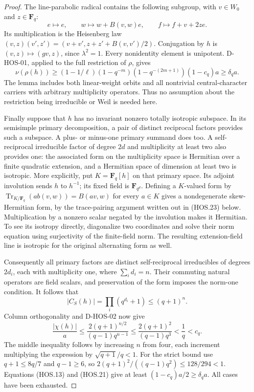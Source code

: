 \begin{proof}
The line-parabolic radical contains the following subgroup, with
$v\in W_0$ and $z\in\mathbf F_q$:
\[
 e\mapsto e,\qquad w\mapsto w+B(v,w)e,\qquad
                 f\mapsto f+v+2ze.                         \tag{HOS.19}
\]
Its multiplication is the Heisenberg law
$(v,z)(v',z')=(v+v',z+z'+B(v,v')/2)$.
Conjugation by $h$ is $(v,z)\mapsto(gv,z)$, since
$\lambda^2=1$. Every nonidentity element is unipotent.
D-HOS-01, applied to the full restriction of $\rho$, gives
\[
 \nu(\rho(h))\ge
 (1-1/\ell)(1-q^{-m})(1-q^{-(2m+1)})(1-c_q)a
                         \ge\delta_q a.                    \tag{HOS.20}
\]
The lemma includes both linear-weight orbits and all nontrivial
central-character carriers with arbitrary multiplicity operators.
Thus no assumption about the restriction being irreducible or
Weil is needed here.

Finally suppose that $h$ has no invariant nonzero totally isotropic
subspace. In its semisimple primary decomposition, a pair of distinct
reciprocal factors provides such a subspace. A plus- or minus-one
primary summand does too. A self-reciprocal irreducible factor of
degree $2d$ and multiplicity at least two also provides one: the
associated form on the multiplicity space is Hermitian over a finite
quadratic extension, and a Hermitian space of dimension at least two
is isotropic. More explicitly, put $K=\mathbf F_q[h]$ on that
primary space. Its adjoint involution sends $h$ to $h^{-1}$;
its fixed field is $\mathbf F_{q^d}$. Defining a $K$-valued
form by $\operatorname{Tr}_{K/\mathbf F_q}(a b(v,w))=B(av,w)$
for every $a\in K$ gives a nondegenerate skew-Hermitian form,
by the trace-pairing argument written out in (HOS.23) below.
Multiplication by a nonzero scalar negated by the involution
makes it Hermitian. To see its isotropy directly, diagonalize two coordinates
and solve their norm equation using surjectivity of the finite-field
norm. The resulting extension-field line is isotropic for the
original alternating form as well.

Consequently all primary factors are distinct self-reciprocal
irreducibles of degrees $2d_i$, each with multiplicity one, where
$\sum_i d_i=n$. Their commuting natural operators are field scalars,
and preservation of the form imposes the norm-one condition.
It follows that
\[
 |C_S(h)|=\prod_i(q^{d_i}+1)\le(q+1)^n.
\]
Column orthogonality and D-HOS-02 now give
\[
 \frac{|\chi(h)|}{a}
 \le\frac{2(q+1)^{n/2}}{(q-1)q^{n-1}}
 \le\frac{2(q+1)^2}{(q-1)q^3}<\frac1q<c_q.                 \tag{HOS.21}
\]
The middle inequality follows by increasing $n$ from four, each
increment multiplying the expression by $\sqrt{q+1}/q<1$.
For the strict bound use $q+1\le8q/7$ and $q-1\ge6$, so
$2(q+1)^2/((q-1)q^2)\le128/294<1$.
Equations (HOS.13) and (HOS.21) give at least
$(1-c_q)a/2\ge\delta_q a$. All cases have been exhausted.
\end{proof}

